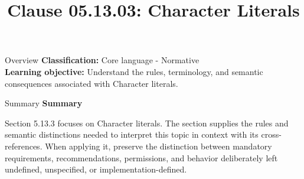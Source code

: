 \documentclass[10pt,letterpaper]{article}
\title{Clause 05.13.03: Character Literals}
\author{}
\date{}
\begin{document}
\maketitle
\begin{CornellOverviewBox}{Overview}
\textbf{Classification:} Core language - Normative\\[2pt]
\textbf{Learning objective:} Understand the rules, terminology, and semantic consequences associated with Character literals.
\end{CornellOverviewBox}\begin{CornellSummaryBox}{Summary}
{\sffamily\bfseries\color{Accent} Summary}\par\vspace{3pt}Section 5.13.3 focuses on Character literals. The section supplies the rules and semantic distinctions needed to interpret this topic in context with its cross-references. When applying it, preserve the distinction between mandatory requirements, recommendations, permissions, and behavior deliberately left undefined, unspecified, or implementation-defined.
\end{CornellSummaryBox}
\end{document}
